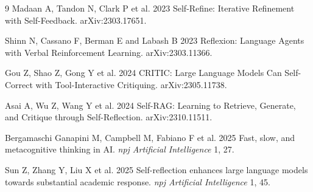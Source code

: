 \documentclass[12pt]{article}
\begin{document}
\begin{thebibliography}{9}
Madaan A, Tandon N, Clark P et al. 2023 Self-Refine: Iterative Refinement with Self-Feedback. arXiv:2303.17651.

Shinn N, Cassano F, Berman E and Labash B 2023 Reflexion: Language Agents with Verbal Reinforcement Learning. arXiv:2303.11366.

Gou Z, Shao Z, Gong Y et al. 2024 CRITIC: Large Language Models Can Self-Correct with Tool-Interactive Critiquing. arXiv:2305.11738.

Asai A, Wu Z, Wang Y et al. 2024 Self-RAG: Learning to Retrieve, Generate, and Critique through Self-Reflection. arXiv:2310.11511.

Bergamaschi Ganapini M, Campbell M, Fabiano F et al. 2025 Fast, slow, and metacognitive thinking in AI. \textit{npj Artificial Intelligence} 1, 27.

Sun Z, Zhang Y, Liu X et al. 2025 Self-reflection enhances large language models towards substantial academic response. \textit{npj Artificial Intelligence} 1, 45.
\end{thebibliography}
\end{document}
